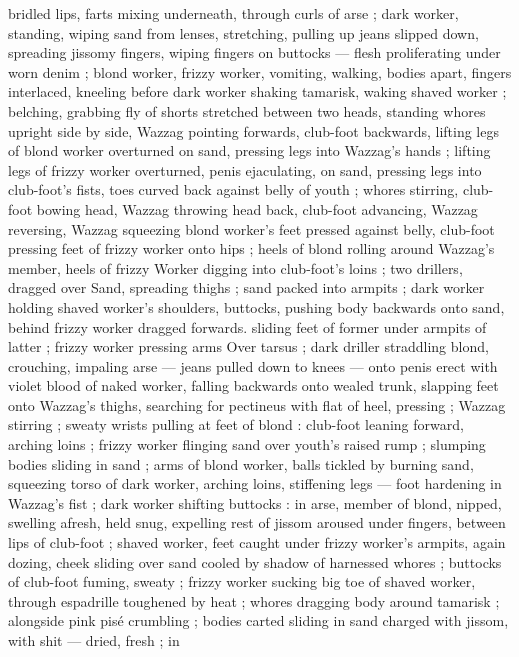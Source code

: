 bridled lips, farts mixing underneath, through curls of arse ; dark 
worker, standing, wiping sand from lenses, stretching, pulling up 
jeans slipped down, spreading jissomy fingers, wiping fingers on 
buttocks --- flesh proliferating under worn denim ; blond worker, 
frizzy worker, vomiting, walking, bodies apart, fingers interlaced, 
kneeling before dark worker shaking tamarisk, waking shaved worker 
; belching, grabbing fly of shorts stretched between two heads, 
standing whores upright side by side, Wazzag pointing forwards, 
club-foot backwards, lifting legs of blond worker overturned on 
sand, pressing legs into Wazzag's hands ; lifting legs of frizzy worker 
overturned, penis ejaculating, on sand, pressing legs into club-foot's 
fists, toes curved back against belly of youth ; whores stirring, club- 
foot bowing head, Wazzag throwing head back, club-foot advancing, 
Wazzag reversing, Wazzag squeezing blond worker's feet pressed 
against belly, club-foot pressing feet of frizzy worker onto hips ; 
heels of blond rolling around Wazzag's member, heels of frizzy 
Worker digging into club-foot's loins ; two drillers, dragged over 
Sand, spreading thighs ; sand packed into armpits ; dark worker 
holding shaved worker's shoulders, buttocks, pushing body 
backwards onto sand, behind frizzy worker dragged forwards. sliding 
feet of former under armpits of latter ; frizzy worker pressing arms 
Over tarsus ; dark driller straddling blond, crouching, impaling arse 
--- jeans pulled down to knees --- onto penis erect with violet blood 
of naked worker, falling backwards onto wealed trunk, slapping feet 
onto Wazzag's thighs, searching for pectineus with flat of heel, 
pressing ; Wazzag stirring ; sweaty wrists pulling at feet of blond : 
club-foot leaning forward, arching loins ; frizzy worker flinging sand 
over youth's raised rump ; slumping bodies sliding in sand ; arms of 
blond worker, balls tickled by burning sand, squeezing torso of dark 
worker, arching loins, stiffening legs --- foot hardening in Wazzag's 
fist ; dark worker shifting buttocks : in arse, member of blond, 
nipped, swelling afresh, held snug, expelling rest of jissom aroused 
under fingers, between lips of club-foot ; shaved worker, feet caught 
under frizzy worker's armpits, again dozing, cheek sliding over sand 
cooled by shadow of harnessed whores ; buttocks of club-foot 
fuming, sweaty ; frizzy worker sucking big toe of shaved worker, 
through espadrille toughened by heat ; whores dragging body 
around tamarisk ; alongside pink pisé crumbling ; bodies carted 
sliding in sand charged with jissom, with shit --- dried, fresh ; in 
